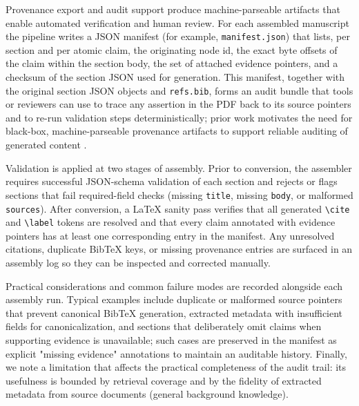 Provenance export and audit support produce machine-parseable artifacts that enable automated verification and human review. For each assembled manuscript the pipeline writes a JSON manifest (for example, \texttt{manifest.json}) that lists, per section and per atomic claim, the originating node id, the exact byte offsets of the claim within the section body, the set of attached evidence pointers, and a checksum of the section JSON used for generation. This manifest, together with the original section JSON objects and \texttt{refs.bib}, forms an audit bundle that tools or reviewers can use to trace any assertion in the PDF back to its source pointers and to re-run validation steps deterministically; prior work motivates the need for black-box, machine-parseable provenance artifacts to support reliable auditing of generated content \cite{web_zhu_2025_auditing_data_provenance_in_real_world_text_to_i}.

Validation is applied at two stages of assembly. Prior to conversion, the assembler requires successful JSON-schema validation of each section and rejects or flags sections that fail required-field checks (missing \texttt{title}, missing \texttt{body}, or malformed \texttt{sources}). After conversion, a LaTeX sanity pass verifies that all generated \verb|\cite| and \verb|\label| tokens are resolved and that every claim annotated with evidence pointers has at least one corresponding entry in the manifest. Any unresolved citations, duplicate BibTeX keys, or missing provenance entries are surfaced in an assembly log so they can be inspected and corrected manually.

Practical considerations and common failure modes are recorded alongside each assembly run. Typical examples include duplicate or malformed source pointers that prevent canonical BibTeX generation, extracted metadata with insufficient fields for canonicalization, and sections that deliberately omit claims when supporting evidence is unavailable; such cases are preserved in the manifest as explicit "missing evidence" annotations to maintain an auditable history. Finally, we note a limitation that affects the practical completeness of the audit trail: its usefulness is bounded by retrieval coverage and by the fidelity of extracted metadata from source documents (general background knowledge).